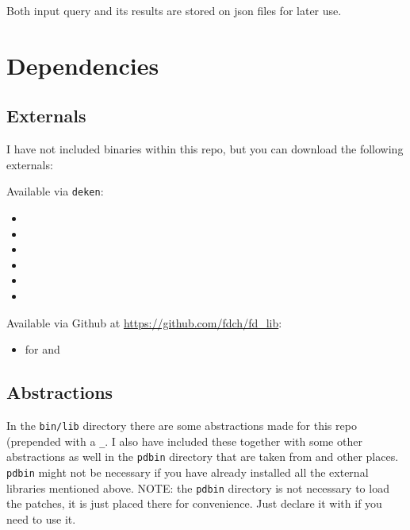 Both input query and its results are stored on \gls{json} files for later use.




\section*{Dependencies}


\subsection*{Externals}

I have not included binaries within this repo, but you can download the following externals:

Available via \texttt{deken}:

\begin{itemize}
  \singlespacing
\tightlist
\item
\item
\item
\item
\item
\item
\end{itemize}

Available via Github at \url{https://github.com/fdch/fd_lib}:

\begin{itemize}
  \singlespacing
\tightlist
\item
   for  and 
\end{itemize}


\subsection*{Abstractions}

In the \texttt{bin/lib} directory there are some abstractions made for this repo (prepended with a \texttt{\_}. I also have included these together with some other abstractions as well in the \texttt{pdbin} directory that are taken from  and other places. \texttt{pdbin} might not be necessary if you have already installed all the external libraries mentioned above. NOTE: the \texttt{pdbin} directory is not necessary to load the patches, it is just placed there for convenience. Just declare it with  if you need to use it.

